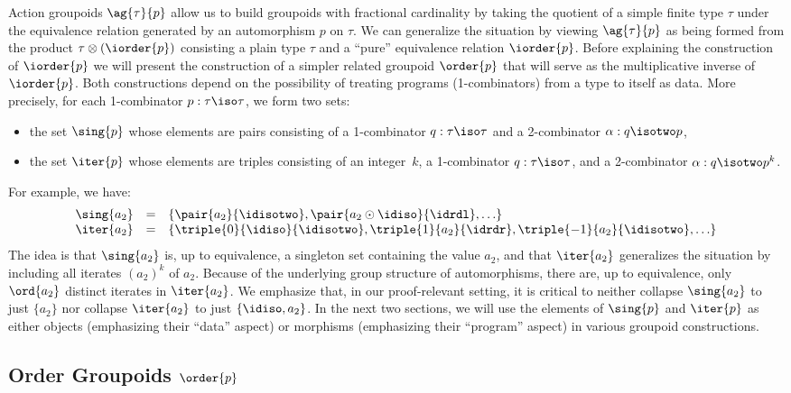 Action groupoids $\ag{\tau}{p}$ allow us to build groupoids with
fractional cardinality by taking the quotient of a simple finite type
$\tau$ under the equivalence relation generated by an automorphism $p$
on $\tau$. We can generalize the situation by viewing $\ag{\tau}{p}$
as being formed from the product $\tau \otimes (\iorder{p})$
consisting a plain type $\tau$ and a ``pure'' equivalence relation
$\iorder{p}$. Before explaining the construction of $\iorder{p}$ we
will present the construction of a simpler related groupoid
$\order{p}$ that will serve as the multiplicative inverse of
$\iorder{p}$. Both constructions depend on the possibility of treating
programs (1-combinators) from a type to itself as data. More
precisely, for each 1-combinator $p : \tau\iso\tau$, we form two sets:
\begin{itemize}
\item the set $\sing{p}$ whose elements are pairs consisting of a
  1-combinator $q : \tau\iso\tau$ and a 2-combinator
  $\alpha : q \isotwo p$, 
\item the set $\iter{p}$ whose elements are triples consisting of an
  integer~$k$, a 1-combinator $q : \tau\iso\tau$, and a 2-combinator
  $\alpha : q \isotwo p^k$.
\end{itemize} 
For example, we have:
\[\begin{array}{rcl}
\sing{a_2} &=& \{ \pair{a_2}{\idisotwo}, \pair{a_2\odot\idiso}{\idrdl},\ldots \} \\
\iter{a_2} &=& \{ \triple{0}{\idiso}{\idisotwo},\triple{1}{a_2}{\idrdr}, \triple{-1}{a_2}{\idisotwo}, \ldots \}
\end{array}\]
The idea is that $\sing{a_2}$ is, up to equivalence, a singleton set
containing the value $a_2$, and that $\iter{a_2}$ generalizes the
situation by including all iterates $(a_2)^k$ of $a_2$.  Because of
the underlying group structure of automorphisms, there are, up to
equivalence, only $\ord{a_2}$ distinct iterates in $\iter{a_2}$.  We
emphasize that, in our proof-relevant setting, it is critical to
neither collapse $\sing{a_2}$ to just $\{ a_2 \}$ nor collapse
$\iter{a_2}$ to just $\{ \idiso, a_2 \}$. In the next two sections, we
will use the elements of $\sing{p}$ and $\iter{p}$ as either objects
(emphasizing their ``data'' aspect) or morphisms (emphasizing their
``program'' aspect) in various groupoid constructions.

\subsection{Order Groupoids $\order{p}$}
   
